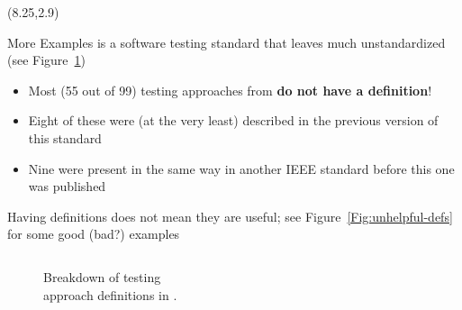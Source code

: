\documentclass[22pt]{beamer}
\begin{document}
\begin{frame}[fragile]
    \begin{textblock}{7.25}(8.25,2.9)
        \begin{block}{\fontsize{37}{20}\selectfont More Examples}
            \cite{IEEE2022} is a software testing standard that
            leaves much unstandardized (see Figure~\ref{Fig:IEEEdefs})
            \begin{itemize}
                \item Most (55 out of 99) testing approaches from \cite{IEEE2022}
                      \textbf{do not have a definition}!
                \item Eight of these were (at the very least) described in the
                      previous version of this standard \cite{IEEE2013}
                \item Nine were present in the same way in another IEEE
                      standard \cite{IEEE2017} before this one was published
            \end{itemize}
            \vspace{5mm}
            Having definitions does not mean they are useful; see
            Figure~\ref{Fig:unhelpful-defs} for some good (bad?) examples
            \vspace{-8mm}
            \begin{columns}
                \begin{column}{0.375\textwidth}
                    \begin{center}
                        \begin{figure}
                            \caption{Breakdown of testing\\approach definitions in
                                \cite{IEEE2022}.}
                            \label{Fig:IEEEdefs}
                        \end{figure}
                    \end{center}
                \end{column}

\end{columns}
\end{block}
\end{textblock}
\end{frame}
\end{document}
